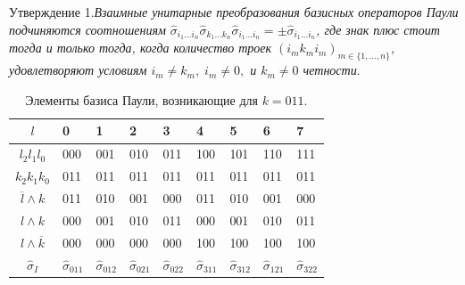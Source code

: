 \documentclass[a4paper]{report}
\begin{document}
\textsf{Утверждение 1.}\textit{Взаимные унитарные преобразования базисных операторов Паули подчиняются соотношениям ${\hat{\sigma}_{i_1\ldots i_n}\hat{\sigma}_{k_1\ldots k_n}\hat{\sigma}_{i_1\ldots i_n}=\pm\hat{\sigma}_{i_1\ldots i_n}}$, где знак плюс стоит тогда и только тогда, когда количество троек ${(i_m k_m i_m)_{m\in\{1,\ldots,n\}}}$, удовлетворяют условиям ${i_m\neq k_m},\;i_m\neq0,$ и ${k_m\neq0}$ четности}.

\begin{table}[h!]
    \centering
    \begin{tabular}{ | c | P{1cm} | P{1cm} | P{1cm} | P{1cm} | P{1cm} | P{1cm} | P{1cm} | P{1cm} | }
        \hline
        ${l}$                    & 0                      & 1                      & 2                      & 3                      & 4                      & 5                      & 6                      & 7                      \\
        \hline
        ${l_2 l_1 l_0}$          & 000                    & 001                    & 010                    & 011                    & 100                    & 101                    & 110                    & 111                    \\
        \hline
        ${k_2 k_1 k_0}$          & 011                    & 011                    & 011                    & 011                    & 011                    & 011                    & 011                    & 011                    \\
        \hline
        ${\overline{l}\wedge k}$ & 011                    & 010                    & 001                    & 000                    & 011                    & 010                    & 001                    & 000                    \\
        \hline
        ${l\wedge k}$            & 000                    & 001                    & 010                    & 011                    & 000                    & 001                    & 010                    & 011                    \\
        \hline
        ${l\wedge \overline{k}}$ & 000                    & 000                    & 000                    & 000                    & 100                    & 100                    & 100                    & 100                    \\
        \hline
        ${\hat{\sigma}_{I}}$     & ${\hat{\sigma}_{011}}$ & ${\hat{\sigma}_{012}}$ & ${\hat{\sigma}_{021}}$ & ${\hat{\sigma}_{022}}$ & ${\hat{\sigma}_{311}}$ & ${\hat{\sigma}_{312}}$ & ${\hat{\sigma}_{121}}$ & ${\hat{\sigma}_{322}}$ \\
        \hline
    \end{tabular}
    \caption{Элементы базиса Паули, возникающие для ${k=011}$.}\label{table2}
\end{table}
\end{document}

